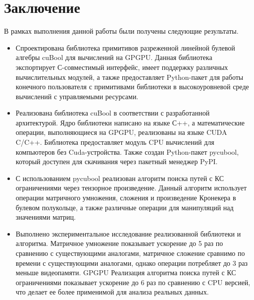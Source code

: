 \section{Заключение}

В рамках выполнения данной работы были получены следующие результаты.

\begin{itemize}
    \item Спроектирована библиотека примитивов разреженной линейной булевой алгебры cuBool для вычислений на GPGPU.
    Данная библиотека экспортирует С-совместимый интерфейс, имеет поддержку различных вычислительных модулей, а также предоставляет Python-пакет для работы конечного пользователя с примитивами библиотеки в высокоуровневой среде вычислений с управляемыми ресурсами.

    \item Реализована библиотека cuBool в соответствии с разработанной архитектурой. 
    Ядро библиотеки написано на языке С++, а математические операции, выполняющиеся на GPGPU, реализованы на языке CUDA C/C++. Библиотека предоставляет модуль CPU вычислений для компьютеров без Cuda-устройства. 
    Также создан Python-пакет pycubool, который доступен для скачивания через пакетный менеджер PyPI.
    
    \item С использованием pycubool реализован алгоритм поиска путей с КС ограничениями через тензорное произведение. 
    Данный алгоритм использует операции матричного умножения, сложения и произведение Кронекера в булевом полукольце, а также различные операции для манипуляций над значениями матриц. 
   
    
    \item Выполнено экспериментальное исследование реализованной библиотеки и алгоритма.
    Матричное умножение показывает ускорение до 5 раз по сравнению с существующими аналогами, 
    матричное сложение сравнимо по времени с существующими аналогами, 
    однако операции потребляет до 3 раз меньше видеопамяти. 
    GPGPU Реализация алгоритма поиска путей с КС ограничениями показывает ускорение до 6 раз по сравнению с CPU версией, что делает ее более применимой для анализа реальных данных.
\end{itemize}

